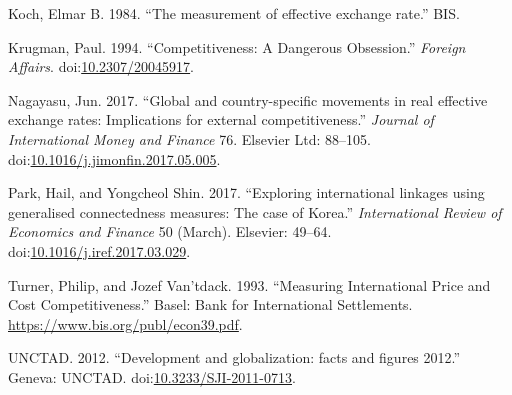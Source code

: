 \documentclass[]{elsarticle} %
\begin{document}
\hypertarget{ref-Koch1984}{}
Koch, Elmar B. 1984. ``The measurement of effective exchange rate.''
BIS.

\hypertarget{ref-Krugman1994}{}
Krugman, Paul. 1994. ``Competitiveness: A Dangerous Obsession.''
\emph{Foreign Affairs}.
doi:\href{https://doi.org/10.2307/20045917}{10.2307/20045917}.

\hypertarget{ref-Nagayasu2017}{}
Nagayasu, Jun. 2017. ``Global and country-specific movements in real
effective exchange rates: Implications for external competitiveness.''
\emph{Journal of International Money and Finance} 76. Elsevier Ltd:
88--105.
doi:\href{https://doi.org/10.1016/j.jimonfin.2017.05.005}{10.1016/j.jimonfin.2017.05.005}.

\hypertarget{ref-Park2017}{}
Park, Hail, and Yongcheol Shin. 2017. ``Exploring international linkages
using generalised connectedness measures: The case of Korea.''
\emph{International Review of Economics and Finance} 50 (March).
Elsevier: 49--64.
doi:\href{https://doi.org/10.1016/j.iref.2017.03.029}{10.1016/j.iref.2017.03.029}.

\hypertarget{ref-Turner1993}{}
Turner, Philip, and Jozef Van'tdack. 1993. ``Measuring International
Price and Cost Competitiveness.'' Basel: Bank for International
Settlements. \url{https://www.bis.org/publ/econ39.pdf}.

\hypertarget{ref-UNCTAD2012}{}
UNCTAD. 2012. ``Development and globalization: facts and figures 2012.''
Geneva: UNCTAD.
doi:\href{https://doi.org/10.3233/SJI-2011-0713}{10.3233/SJI-2011-0713}.
\end{document}
